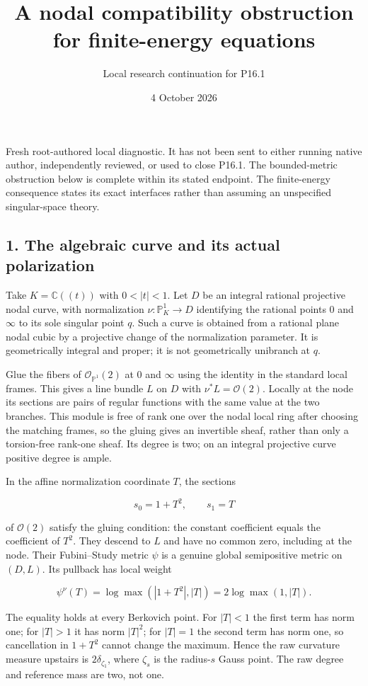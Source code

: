 \documentclass[
  11pt,
]{article}
\title{A nodal compatibility obstruction for finite-energy equations}
\author{Local research continuation for P16.1}
\date{4 October 2026}
\begin{document}
\maketitle

Fresh root-authored local diagnostic. It has not been sent to either
running native author, independently reviewed, or used to close P16.1.
The bounded-metric obstruction below is complete within its stated
endpoint. The finite-energy consequence states its exact interfaces
rather than assuming an unspecified singular-space theory.

\subsection{1. The algebraic curve and its actual
polarization}\label{the-algebraic-curve-and-its-actual-polarization}

Take \(K=\mathbb C((t))\) with \(0<|t|<1\). Let \(D\) be an integral
rational projective nodal curve, with normalization
\(\nu:\mathbb P^1_K\to D\) identifying the rational points \(0\) and
\(\infty\) to its sole singular point \(q\). Such a curve is obtained
from a rational plane nodal cubic by a projective change of the
normalization parameter. It is geometrically integral and proper; it is
not geometrically unibranch at \(q\).

Glue the fibers of \(\mathcal O_{\mathbb P^1}(2)\) at \(0\) and
\(\infty\) using the identity in the standard local frames. This gives a
line bundle \(L\) on \(D\) with \(\nu^*L=\mathcal O(2)\). Locally at the
node its sections are pairs of regular functions with the same value at
the two branches. This module is free of rank one over the nodal local
ring after choosing the matching frames, so the gluing gives an
invertible sheaf, rather than only a torsion-free rank-one sheaf. Its
degree is two; on an integral projective curve positive degree is ample.

In the affine normalization coordinate \(T\), the sections

\[
s_0=1+T^2,\qquad s_1=T
\]

of \(\mathcal O(2)\) satisfy the gluing condition: the constant
coefficient equals the coefficient of \(T^2\). They descend to \(L\) and
have no common zero, including at the node. Their Fubini--Study metric
\(\psi\) is a genuine global semipositive metric on \((D,L)\). Its
pullback has local weight

\[
\psi^\nu(T)=\log\max(|1+T^2|,|T|)=2\log\max(1,|T|).
\]

The equality holds at every Berkovich point. For \(|T|<1\) the first
term has norm one; for \(|T|>1\) it has norm \(|T|^2\); for \(|T|=1\)
the second term has norm one, so cancellation in \(1+T^2\) cannot change
the maximum. Hence the raw curvature measure upstairs is
\(2\delta_{\zeta_1}\), where \(\zeta_s\) is the radius-\(s\) Gauss
point. The raw degree and reference mass are two, not one.
\end{document}
